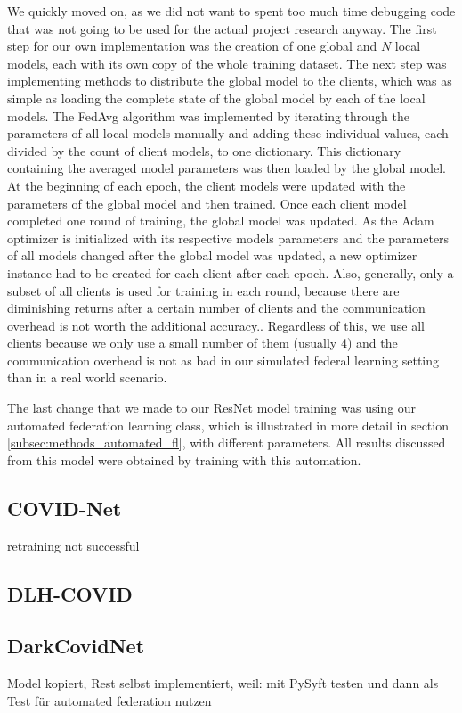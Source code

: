 We quickly moved on, as we did not want to spent too much time debugging code that was not going to be used for the actual project research anyway. The first step for our own implementation was the creation of one global and $N$ local models, each with its own copy of the whole training dataset.
The next step was implementing methods to distribute the global model to the clients, which was as simple as loading the complete state of the global model by each of the local models. The FedAvg algorithm was implemented by iterating through the parameters of all local models manually and adding these individual values, each divided by the count of client models, to one dictionary. This dictionary containing the averaged model parameters was then loaded by the global model.
At the beginning of each epoch, the client models were updated with the parameters of the global model and then trained. Once each client model completed one round of training, the global model was updated.
As the Adam optimizer is initialized with its respective models parameters and the parameters of all models changed after the global model was updated, a new optimizer instance had to be created for each client after each epoch.
Also, generally, only a subset of all clients is used for training in each round, because there are diminishing returns after a certain number of clients and the communication overhead is not worth the additional accuracy.\cite{fl_paper}. Regardless of this, we use all clients because we only use a small number of them (usually 4) and the communication overhead is not as bad in our simulated federal learning setting than in a real world scenario.

The last change that we made to our ResNet model training was using our automated federation learning class, which is illustrated in more detail in section \ref{subsec:methods_automated_fl}, with different parameters. All results discussed from this model were obtained by training with this automation.

\subsection{COVID-Net}\label{subsec:dev_covidnet}

retraining not successful

\subsection{DLH-COVID}
\subsection{DarkCovidNet}
Model kopiert, Rest selbst implementiert, weil: mit PySyft testen und dann als Test für automated federation nutzen
